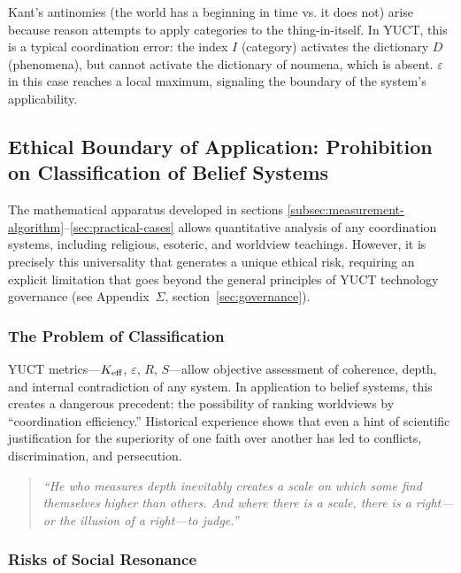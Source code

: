 \documentclass[12pt,a4paper]{article}
\newcommand{\eps}{\varepsilon}
\begin{document}
	Kant's antinomies (the world has a beginning in time vs. it does not) arise because reason attempts to apply categories to the thing-in-itself. In YUCT, this is a typical coordination error: the index \(I\) (category) activates the dictionary \(D\) (phenomena), but cannot activate the dictionary of noumena, which is absent. \(\eps\) in this case reaches a local maximum, signaling the boundary of the system's applicability.
	
	\subsection{Ethical Boundary of Application: Prohibition on Classification of Belief Systems}
	\label{subsec:belief-classification}
	
	The mathematical apparatus developed in sections \ref{subsec:measurement-algorithm}–\ref{sec:practical-cases} allows quantitative analysis of any coordination systems, including religious, esoteric, and worldview teachings. However, it is precisely this universality that generates a unique ethical risk, requiring an explicit limitation that goes beyond the general principles of YUCT technology governance (see Appendix~$\Sigma$, section~\ref{sec:governance}).
	
	\subsubsection{The Problem of Classification}
	
	YUCT metrics—$\Keff$, $\eps$, $R$, $S$—allow objective assessment of coherence, depth, and internal contradiction of any system. In application to belief systems, this creates a dangerous precedent: the possibility of ranking worldviews by ``coordination efficiency.'' Historical experience shows that even a hint of scientific justification for the superiority of one faith over another has led to conflicts, discrimination, and persecution.
	
	\begin{quote}
		\itshape
		``He who measures depth inevitably creates a scale on which some find themselves higher than others. And where there is a scale, there is a right—or the illusion of a right—to judge.''
	\end{quote}
	
	\subsubsection{Risks of Social Resonance}
	
\end{document}

